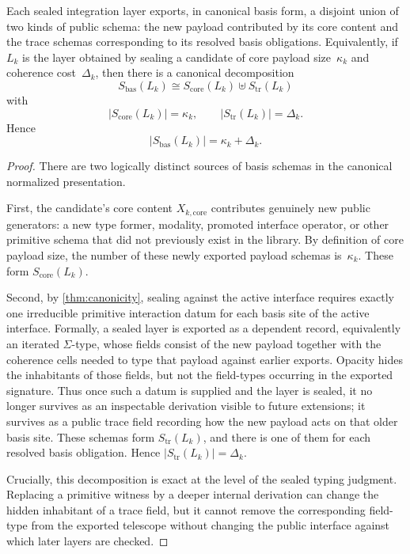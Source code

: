 \documentclass{lmcs}
\begin{document}
\begin{thm}
\label{thm:trace}
Each sealed integration layer exports, in canonical basis form, a disjoint union of two kinds of public schema: the new payload contributed by its core content and the trace schemas corresponding to its resolved basis obligations. Equivalently, if $L_k$ is the layer obtained by sealing a candidate of core payload size~$\kappa_k$ and coherence cost~$\Delta_k$, then there is a canonical decomposition
\[
  S_{\mathrm{bas}}(L_k) \cong S_{\mathrm{core}}(L_k) \uplus S_{\mathrm{tr}}(L_k)
\]
with
\[
  |S_{\mathrm{core}}(L_k)| = \kappa_k,
  \qquad
  |S_{\mathrm{tr}}(L_k)| = \Delta_k.
\]
Hence
\[
  |S_{\mathrm{bas}}(L_k)| = \kappa_k + \Delta_k.
\]
\end{thm}

\begin{proof}
There are two logically distinct sources of basis schemas in the canonical normalized presentation.

First, the candidate's core content $X_{k,\mathrm{core}}$ contributes genuinely new public generators: a new type former, modality, promoted interface operator, or other primitive schema that did not previously exist in the library. By definition of core payload size, the number of these newly exported payload schemas is~$\kappa_k$. These form $S_{\mathrm{core}}(L_k)$.

Second, by \autoref{thm:canonicity}, sealing against the active interface requires exactly one irreducible primitive interaction datum for each basis site of the active interface. Formally, a sealed layer is exported as a dependent record, equivalently an iterated $\Sigma$-type, whose fields consist of the new payload together with the coherence cells needed to type that payload against earlier exports. Opacity hides the inhabitants of those fields, but not the field-types occurring in the exported signature. Thus once such a datum is supplied and the layer is sealed, it no longer survives as an inspectable derivation visible to future extensions; it survives as a public trace field recording how the new payload acts on that older basis site. These schemas form $S_{\mathrm{tr}}(L_k)$, and there is one of them for each resolved basis obligation. Hence $|S_{\mathrm{tr}}(L_k)|=\Delta_k$.

Crucially, this decomposition is exact at the level of the sealed typing judgment. Replacing a primitive witness by a deeper internal derivation can change the hidden inhabitant of a trace field, but it cannot remove the corresponding field-type from the exported telescope without changing the public interface against which later layers are checked.


\end{proof}
\end{document}
